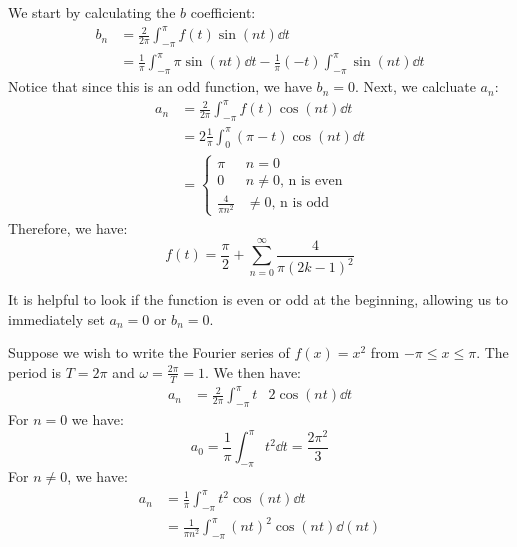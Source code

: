 \begin{itemize}
\begin{example}
        We start by calculating the $b$ coefficient:
        \begin{align}
            b_n &= \frac{2}{2\pi} \int_{-\pi}^{\pi} f(t) \sin(nt) \dd{t} \\ 
            &= \frac{1}{\pi}\int_{-\pi}^{\pi} \pi \sin(nt) \dd{t} - \frac{1}{\pi}(-t)\int_{-\pi}^{\pi}\sin (nt) \dd{t}
        \end{align}
        Notice that since this is an odd function, we have $b_n=0$. Next, we calcluate $a_n$:
        \begin{align}
            a_n &= \frac{2}{2\pi}\int_{-\pi}^{\pi} f(t) \cos(nt) \dd{t} \\ 
            &= 2\frac{1}{\pi} \int_0^{\pi}(\pi -t)\cos(nt) \dd{t} \\ 
            &= \begin{cases}
                \pi & n=0 \\ 
                0 & n\neq 0,\,\text{n is even} \\ 
                \frac{4}{\pi n^2} & \neq 0,\,\text{n is odd}
            \end{cases}
        \end{align}
        Therefore, we have:
        \begin{equation}
            f(t) = \frac{\pi}{2} + \sum_{n=0}^\infty \frac{4}{\pi (2k-1)^2}
        \end{equation}
    \end{example}
    \begin{idea}
        It is helpful to look if the function is even or odd at the beginning, allowing us to immediately set $a_n=0$ or $b_n=0$.
    \end{idea}
    \begin{example}
        Suppose we wish to write the Fourier series of $f(x)=x^2$ from $-\pi \le x \le \pi$. The period is $T=2\pi$ and $\omega = \frac{2\pi}{T}=1$. We then have:
        \begin{align}
            a_n &= \frac{2}{2\pi} \int_{-\pi}^{\pi} t&2 \cos(nt) \dd{t}
        \end{align}
        For $n=0$ we have:
        \begin{equation}
            a_0 = \frac{1}{\pi}\int_{-\pi}^{\pi} t^2 \dd{t} = \frac{2\pi^2}{3}
        \end{equation}
        For $n\neq 0$, we have:
        \begin{align}
            a_n &= \frac{1}{\pi}\int_{-\pi}^{\pi} t^2\cos(nt)\dd{t} \\ 
            &= \frac{1}{\pi n^2}\int_{-\pi}^{\pi} (nt)^2 \cos(nt) \dd{(nt)} \\ 

\end{align}
\end{example}
\end{itemize}
